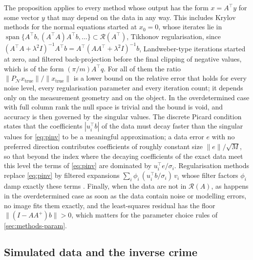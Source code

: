 \documentclass[11pt,a4paper]{article}
\numberwithin{equation}{section}
\theoremstyle{remark}
\newcommand{\RR}{\mathcal{R}}
\newcommand{\NN}{\mathcal{N}}
\newcommand{\xt}{x_{\mathrm{true}}}
\newcommand{\T}{\top}
\begin{document}
The proposition applies to every method whose output has the form $x=A^\T y$ for some vector $y$ that may depend on the data in any way. This includes Krylov methods for the normal equations started at $x_0=0$, whose iterates lie in $\operatorname{span}\{A^\T b,(A^\T A)A^\T b,\dots\}\subset\RR(A^\T)$, Tikhonov regularisation, since $(A^\T A+\lambda^2I)^{-1}A^\T b=A^\T(AA^\T+\lambda^2I)^{-1}b$, Landweber-type iterations started at zero, and filtered back-projection before the final clipping of negative values, which is of the form $(\pi/m)A^\T q$. For all of them the ratio $\|P_{\NN}\xt\|/\|\xt\|$ is a lower bound on the relative error that holds for every noise level, every regularisation parameter and every iteration count; it depends only on the measurement geometry and on the object. In the overdetermined case with full column rank the null space is trivial and the bound is void, and accuracy is then governed by the singular values. The discrete Picard condition \citep{hansen1990} states that the coefficients $|u_i^\T b|$ of the data must decay faster than the singular values for \eqref{eq:pinv} to be a meaningful approximation; a data error $e$ with no preferred direction contributes coefficients of roughly constant size $\|e\|/\sqrt M$, so that beyond the index where the decaying coefficients of the exact data meet this level the terms of \eqref{eq:pinv} are dominated by $u_i^\T e/\sigma_i$. Regularisation methods replace \eqref{eq:pinv} by filtered expansions $\sum_i\phi_i\,(u_i^\T b/\sigma_i)\,v_i$ whose filter factors $\phi_i$ damp exactly these terms \citep{hansen2010,engl1996}. Finally, when the data are not in $\RR(A)$, as happens in the overdetermined case as soon as the data contain noise or modelling errors, no image fits them exactly, and the least-squares residual has the floor $\|(I-AA^+)b\|>0$, which matters for the parameter choice rules of \cref{sec:methods-param}.

\subsection{Simulated data and the inverse crime}\label{sec:discrete-data}
\end{document}
